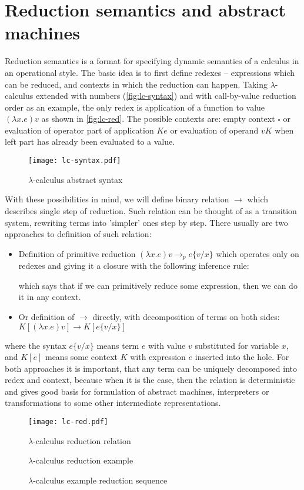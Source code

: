 \documentclass[inz, english, shortabstract]{iithesis}
\newcommand{\LC}{\(\lambda\)-calculus}
\begin{document}
\section{Reduction semantics and abstract machines}
Reduction semantics\cite{Felleisen2009} is a format for specifying dynamic semantics of a calculus in an operational style.
The basic idea is to first define redexes -- expressions which can be reduced, and contexts in which the reduction can happen.
Taking \LC{} extended with numbers (\autoref{fig:lc-syntax}) and with call-by-value reduction order as an example, the only redex is application of a function to value $ (\lambda x . e) v $ as shown in \autoref{fig:lc-red}.
The possible contexts are: empty context $ \square $ or evaluation of operator part of application $ K e $ or evaluation of operand $ v K $ when left part has already been evaluated to a value.
\begin{figure}
  \texttt{[image: lc-syntax.pdf]}
  \caption{\LC{} abstract syntax}
  \label{fig:lc-syntax}
\end{figure}
With these possibilities in mind, we will define binary relation $ \longrightarrow $ which describes single step of reduction.
Such relation can be thought of as a transition system, rewriting terms into 'simpler' ones step by step.
There usually are two approaches to definition of such relation:
\begin{itemize}
  \item Definition of primitive reduction $ (\lambda x . e) v \longrightarrow_p e\{v/x\} $ which operates only on redexes and giving it a closure with the following inference rule:
  
  \begin{prooftree}
  \end{prooftree}

  which says that if we can primitively reduce some expression, then we can do it in any context.
  \item Or definition of $ \longrightarrow $ directly, with decomposition of terms on both sides: $ K[(\lambda x . e) v] \longrightarrow K[e\{v/x\}] $
\end{itemize}
where the syntax $ e\{v/x\} $ means term $ e $ with value $ v $ substituted for variable $ x $, and $ K[e] $ means some context $ K $ with expression $ e $ inserted into the hole.
For both approaches it is important, that any term can be uniquely decomposed into redex and context, because when it is the case, then the relation is deterministic and gives good basis for formulation of abstract machines, interpreters or transformations to some other intermediate representations.
\begin{figure}
  \texttt{[image: lc-red.pdf]} 
  \caption{\LC{} reduction relation}
  \label{fig:lc-red}
\end{figure}
\begin{figure}
  \LC{} reduction example
  \caption{\LC{} example reduction sequence}
  \label{fig:lc-red-example}
\end{figure}
\end{document}
